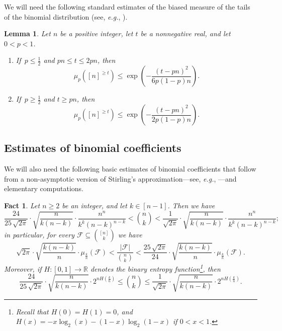 \documentclass[10pt,a4paper]{amsart}
\newtheorem{lem}[thm]{Lemma}
\newtheorem{fact}[thm]{Fact}
\theoremstyle{remark}
\newcommand{\rr}{\mathbb{R}}
\newcommand{\meg}{\geqslant}
\newcommand{\mik}{\leqslant}
\newcommand{\Fcal}{\mathcal{F}}
\begin{document}
We will need the following standard estimates of the biased measure of the tails of the
binomial distribution (see, \textit{e.g.}, \cite[Appendix A]{AS16}).
\begin{lem} \label{l2.3}
Let $n$ be a positive integer, let $t$ be a nonnegative real, and let\, $0<p<1$.
\begin{enumerate}
\item[(i)] If\, $p\mik \frac12 $ and $pn\mik t\mik 2pn$, then
\begin{equation} \label{e2.2}
\mu_p\left([n]^{\meg t}\right)
\mik \exp\left(-\frac{(t-pn)^2}{6p(1-p)n}\right).
\end{equation}
\item[(ii)] If\, $p\meg \frac12 $ and $t\meg pn$, then
\begin{equation} \label{e2.3}
\mu_p\left([n]^{\meg t}\right) \mik \exp\left(-\frac{(t-pn)^2}{2p(1-p)n}\right).
\end{equation}
\end{enumerate}
\end{lem}

\subsection{Estimates of binomial coefficients} \label{subsec2.5}

We will also need the following basic estimates of binomial coefficients that follow from a
non-asymptotic version of Stirling's approximation---see, \textit{e.g.}, \cite{Ro55}---and elementary computations.
\begin{fact} \label{f2.4}
Let $n\meg 2$ be an integer, and let $k\in [n-1]$. Then we have
\begin{equation} \label{e2.4}
\frac{24}{25 \, \sqrt{2\pi}} \cdot \sqrt{\frac{n}{k(n-k)}}\cdot \frac{n^n}{k^k(n-k)^{n-k}}<
\binom{n}{k}< \frac{1}{\sqrt{2\pi}}\cdot \sqrt{\frac{n}{k(n-k)}}\cdot \frac{n^n}{k^k(n-k)^{n-k}};
\end{equation}
in particular, for every $\Fcal\subseteq \binom{[n]}{k}$ we have
\begin{equation} \label{e2.5}
\sqrt{2\pi}\cdot \sqrt{\frac{k(n-k)}{n}} \cdot \mu_{\frac{k}{n}}(\Fcal) <
\frac{|\Fcal|}{\binom{n}{k}} < \frac{25 \, \sqrt{2\pi}}{24} \cdot \sqrt{\frac{k(n-k)}{n}}\cdot \mu_{\frac{k}{n}}(\Fcal).
\end{equation}
Moreover, if $H\colon [0,1]\to\rr$ denotes the binary entropy function\footnote{Recall that $H(0)=H(1)=0$,
and $H(x)=-x\log_2(x)-(1-x)\log_2(1-x)$ if $0<x<1$.}, then
\begin{equation} \label{e2.6}
\frac{24}{25 \, \sqrt{2\pi}} \cdot \sqrt{\frac{n}{k(n-k)}}\cdot 2^{nH(\frac{k}{n})} \mik \binom{n}{k} \mik
\frac{1}{\sqrt{2\pi}}\cdot \sqrt{\frac{n}{k(n-k)}}\cdot 2^{nH(\frac{k}{n})}.
\end{equation}
\end{fact}
\end{document}
